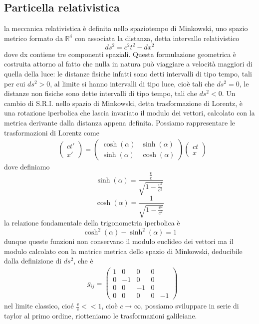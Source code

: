 \documentclass[
10pt, %
a4paper, %
oneside, %
headinclude,footinclude, %
BCOR5mm, %
]{scrartcl}
\begin{document}
\subsection{Particella relativistica}
la meccanica relativistica è definita nello spaziotempo di Minkowski, uno spazio metrico formato da \(\mathbb{R}^4\) con associata la distanza, detta intervallo relativistico
\[ds^2 = c^2t^2-dx^2\]
dove dx contiene tre componenti spaziali. Questa formulazione geometrica è costruita attorno al fatto che nulla in natura può viaggiare a velocità maggiori di quella della luce: le distanze fisiche infatti sono detti intervalli di tipo tempo, tali per cui \(ds^2>0\), al limite si hanno intervalli di tipo luce, cioè tali che \(ds^2 = 0\), le distanze non fisiche sono dette intervalli di tipo tempo, tali che \(ds^2 < 0\). Un cambio di S.R.I. nello spazio di Minkowski, detta trasformazione di Lorentz, è una rotazione iperbolica che lascia invariato il modulo dei vettori, calcolato con la metrica derivante dalla distanza appena definita. Possiamo rappresentare le trasformazioni di Lorentz come
\begin{align*}
	&\begin{pmatrix}
		ct'\\
		x'
	\end{pmatrix} = 
	\begin{pmatrix}
		\cosh(\alpha)&\sinh(\alpha)\\
		\sinh(\alpha)&\cosh(\alpha)
	\end{pmatrix}
	\begin{pmatrix}
		ct\\
		x
	\end{pmatrix}
\end{align*}
dove definiamo
\[\sinh(\alpha) = \frac{\frac{v}{c}}{\sqrt{1-\frac{v^2}{c^2}}}\]
\[\cosh(\alpha) = \frac{1}{\sqrt{1-\frac{v^2}{c^2}}}\]
la relazione fondamentale della trigonometria iperbolica è 
\[\cosh^2(\alpha)-\sinh^2(\alpha) = 1\]
dunque queste funzioni non conservano il modulo euclideo dei vettori ma il modulo calcolato con la matrice metrica dello spazio di Minkowski, deducibile dalla definizione di \(ds^2\), che è
\begin{align*}
	&g_{ij} =
	\begin{pmatrix}
		1&0&0&0\\
		0&-1&0&0\\
		0&0&-1&0\\
		0&0&0&0&-1
	\end{pmatrix}
\end{align*}
nel limite classico, cioé \(\frac{v}{c}<<1\), cioè \(c\rightarrow \infty\), possiamo sviluppare in serie di taylor al primo ordine, riotteniamo le trasformazioni galileiane.\\
\end{document}

